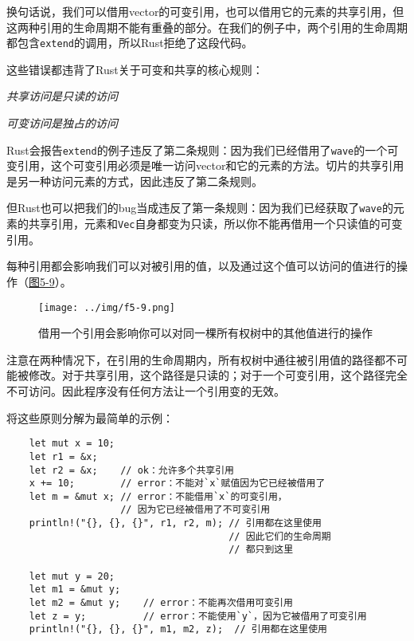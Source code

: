换句话说，我们可以借用vector的可变引用，也可以借用它的元素的共享引用，但这两种引用的生命周期不能有重叠的部分。在我们的例子中，两个引用的生命周期都包含\texttt{extend}的调用，所以Rust拒绝了这段代码。

这些错误都违背了Rust关于可变和共享的核心规则：

\begin{flushleft}
    \emph{共享访问是只读的访问}
\end{flushleft}


\begin{flushleft}
    \emph{可变访问是独占的访问}
\end{flushleft}


Rust会报告\texttt{extend}的例子违反了第二条规则：因为我们已经借用了\texttt{wave}的一个可变引用，这个可变引用必须是唯一访问vector和它的元素的方法。切片的共享引用是另一种访问元素的方式，因此违反了第二条规则。

但Rust也可以把我们的bug当成违反了第一条规则：因为我们已经获取了\texttt{wave}的元素的共享引用，元素和\texttt{Vec}自身都变为只读，所以你不能再借用一个只读值的可变引用。

每种引用都会影响我们可以对被引用的值，以及通过这个值可以访问的值进行的操作（\hyperref[f5-9]{图5-9}）。

\begin{figure}[htbp]
    \centering
    \texttt{[image: ../img/f5-9.png]}
    \caption{借用一个引用会影响你可以对同一棵所有权树中的其他值进行的操作}
    \label{f5-9}
\end{figure}

注意在两种情况下，在引用的生命周期内，所有权树中通往被引用值的路径都不可能被修改。对于共享引用，这个路径是只读的；对于一个可变引用，这个路径完全不可访问。因此程序没有任何方法让一个引用变的无效。

将这些原则分解为最简单的示例：
\begin{verbatim}
    let mut x = 10;
    let r1 = &x;
    let r2 = &x;    // ok：允许多个共享引用
    x += 10;        // error：不能对`x`赋值因为它已经被借用了
    let m = &mut x; // error：不能借用`x`的可变引用，
                    // 因为它已经被借用了不可变引用
    println!("{}, {}, {}", r1, r2, m); // 引用都在这里使用
                                       // 因此它们的生命周期
                                       // 都只到这里

    let mut y = 20;
    let m1 = &mut y;
    let m2 = &mut y;    // error：不能再次借用可变引用
    let z = y;          // error：不能使用`y`，因为它被借用了可变引用
    println!("{}, {}, {}", m1, m2, z);  // 引用都在这里使用
\end{verbatim}

